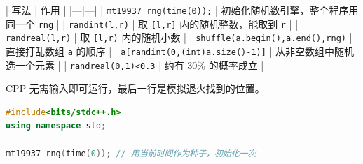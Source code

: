 \documentclass[10pt,landscape,a4paper]{article}
\begin{document}
\begin{multicols*}{3}
| 写法 | 作用 | |---|---| | \texttt{m\allowbreak{}t\allowbreak{}1\allowbreak{}9\allowbreak{}9\allowbreak{}3\allowbreak{}7\allowbreak{} \allowbreak{}r\allowbreak{}n\allowbreak{}g\allowbreak{}(\allowbreak{}t\allowbreak{}i\allowbreak{}m\allowbreak{}e\allowbreak{}(\allowbreak{}0\allowbreak{})\allowbreak{})\allowbreak{};} | 初始化随机数引擎，整个程序用同一个 \texttt{r\allowbreak{}n\allowbreak{}g} | | \texttt{r\allowbreak{}a\allowbreak{}n\allowbreak{}d\allowbreak{}i\allowbreak{}n\allowbreak{}t\allowbreak{}(\allowbreak{}l\allowbreak{},\allowbreak{}r\allowbreak{})} | 取 \texttt{[\allowbreak{}l\allowbreak{},\allowbreak{}r\allowbreak{}]} 内的随机整数，能取到 \texttt{r} | | \texttt{r\allowbreak{}a\allowbreak{}n\allowbreak{}d\allowbreak{}r\allowbreak{}e\allowbreak{}a\allowbreak{}l\allowbreak{}(\allowbreak{}l\allowbreak{},\allowbreak{}r\allowbreak{})} | 取 \texttt{[\allowbreak{}l\allowbreak{},\allowbreak{}r\allowbreak{})} 内的随机小数 | | \texttt{s\allowbreak{}h\allowbreak{}u\allowbreak{}f\allowbreak{}f\allowbreak{}l\allowbreak{}e\allowbreak{}(\allowbreak{}a\allowbreak{}.\allowbreak{}b\allowbreak{}e\allowbreak{}g\allowbreak{}i\allowbreak{}n\allowbreak{}(\allowbreak{})\allowbreak{},\allowbreak{}a\allowbreak{}.\allowbreak{}e\allowbreak{}n\allowbreak{}d\allowbreak{}(\allowbreak{})\allowbreak{},\allowbreak{}r\allowbreak{}n\allowbreak{}g\allowbreak{})} | 直接打乱数组 \texttt{a} 的顺序 | | \texttt{a\allowbreak{}[\allowbreak{}r\allowbreak{}a\allowbreak{}n\allowbreak{}d\allowbreak{}i\allowbreak{}n\allowbreak{}t\allowbreak{}(\allowbreak{}0\allowbreak{},\allowbreak{}(\allowbreak{}i\allowbreak{}n\allowbreak{}t\allowbreak{})\allowbreak{}a\allowbreak{}.\allowbreak{}s\allowbreak{}i\allowbreak{}z\allowbreak{}e\allowbreak{}(\allowbreak{})\allowbreak{}-\allowbreak{}1\allowbreak{})\allowbreak{}]} | 从非空数组中随机选一个元素 | | \texttt{r\allowbreak{}a\allowbreak{}n\allowbreak{}d\allowbreak{}r\allowbreak{}e\allowbreak{}a\allowbreak{}l\allowbreak{}(\allowbreak{}0\allowbreak{},\allowbreak{}1\allowbreak{})\allowbreak{}\textless{}\allowbreak{}0\allowbreak{}.\allowbreak{}3} | 约有 30\% 的概率成立 |\par
CPP 无需输入即可运行，最后一行是模拟退火找到的位置。\par
\par{}\par
\begin{lstlisting}[language=C++]
#include<bits/stdc++.h>
using namespace std;

mt19937 rng(time(0)); // 用当前时间作为种子，初始化一次


\end{lstlisting}
\end{multicols*}
\end{document}
